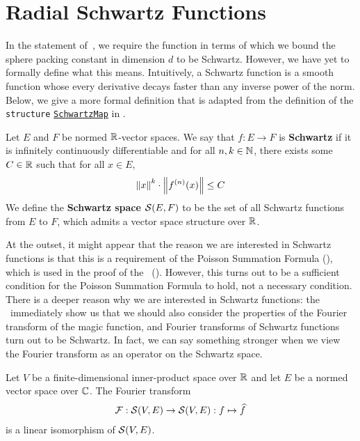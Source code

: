 \section{Radial Schwartz Functions}

In the statement of~, we require the function in terms of which we bound the sphere packing constant in dimension $d$ to be Schwartz. However, we have yet to formally define what this means. Intuitively, a Schwartz function is a smooth function whose every derivative decays faster than any inverse power of the norm. Below, we give a more formal definition that is adapted from the definition of the \verb|structure| \href{https://github.com/leanprover-community/mathlib4/blob/bb076f5f2d39b534b917755b0338314b6714304b/Mathlib/Analysis/Distribution/SchwartzSpace.lean#L74-L79}{\texttt{SchwartzMap}} in \mathlib.

\begin{boxdefinition}
    Let $E$ and $F$ be normed $\mathbb{R}$-vector spaces. We say that $f : E \to F$ is \textbf{Schwartz} if it is infinitely continuously differentiable and for all $n, k \in \mathbb{N}$, there exists some $C \in \mathbb{R}$ such that for all $x \in E$,
    \begin{align}
        \left\lVert x \right\rVert^k \cdot \left\lVert f^{(n)}(x) \right\rVert \leq C
        \label{Ch3:Eq:SchwartzDecayProperty}
    \end{align}
    We define the \textbf{Schwartz space} $\mathcal{S}(E, F)$ to be the set of all Schwartz functions from $E$ to $F$, which admits a vector space structure over $\mathbb{R}$.
\end{boxdefinition}

At the outset, it might appear that the reason we are interested in Schwartz functions is that this is a requirement of the Poisson Summation Formula (), which is used in the proof of the \CELP\ (). However, this turns out to be a sufficient condition for the Poisson Summation Formula to hold, not a necessary condition. There is a deeper reason why we are interested in Schwartz functions: the \CEC\ immediately show us that we should also consider the properties of the Fourier transform of the magic function, and Fourier transforms of Schwartz functions turn out to be Schwartz. In fact, we can say something stronger when we view the Fourier transform as an operator on the Schwartz space.

\begin{boxtheorem}\label{Ch3:Thm:FourierSchwartz_CLE}
    Let $V$ be a finite-dimensional inner-product space over $\mathbb{R}$ and let $E$ be a normed vector space over $\mathbb{C}$. The Fourier transform
    \begin{align*}
        \mathcal{F} : \mathcal{S}(V, E) \to \mathcal{S}(V, E) : f \mapsto \widehat{f}
    \end{align*}
    is a linear isomorphism of $\mathcal{S}(V, E)$. %
\end{boxtheorem}

